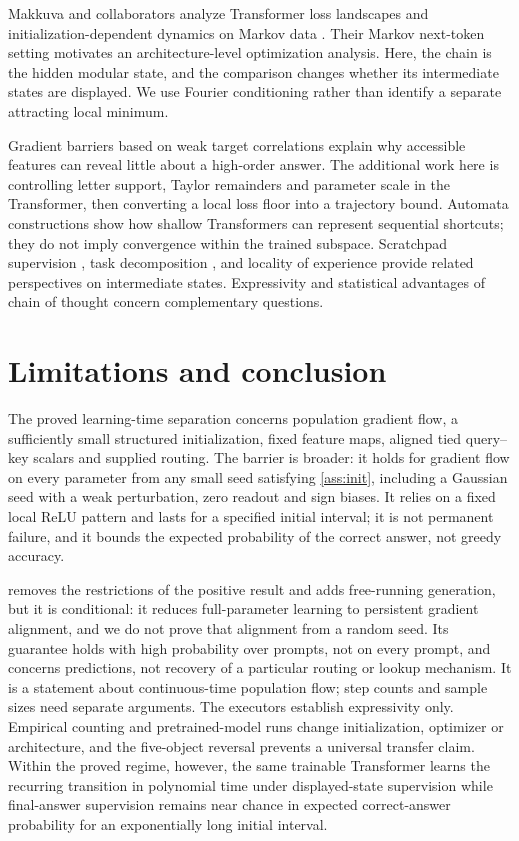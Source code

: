 Makkuva and collaborators analyze Transformer loss landscapes and initialization-dependent dynamics on Markov data \citep{makkuva2025attention,makkuva2024local}. Their Markov next-token setting motivates an architecture-level optimization analysis. Here, the chain is the hidden modular state, and the comparison changes whether its intermediate states are displayed. We use Fourier conditioning rather than identify a separate attracting local minimum.

Gradient barriers based on weak target correlations \citep{shalevshwartz2017failures,abbe2025parities} explain why accessible features can reveal little about a high-order answer. The additional work here is controlling letter support, Taylor remainders and parameter scale in the Transformer, then converting a local loss floor into a trajectory bound. Automata constructions \citep{liu2023automata} show how shallow Transformers can represent sequential shortcuts; they do not imply convergence within the trained subspace. Scratchpad supervision \citep{nye2021scratchpads}, task decomposition \citep{wies2023subtask}, and locality of experience \citep{prystawski2023think} provide related perspectives on intermediate states. Expressivity and statistical advantages of chain of thought \citep{merrill2024expressive,wen2024sparse} concern complementary questions.


\section{Limitations and conclusion}\label{sec:conclusion}
The proved learning-time separation concerns population gradient flow, a sufficiently small structured initialization, fixed feature maps, aligned tied query--key scalars and supplied routing. The barrier is broader: it holds for gradient flow on every parameter from any small seed satisfying \cref{ass:init}, including a Gaussian seed with a weak perturbation, zero readout and sign biases. It relies on a fixed local ReLU pattern and lasts for a specified initial interval; it is not permanent failure, and it bounds the expected probability of the correct answer, not greedy accuracy.

 removes the restrictions of the positive result and adds free-running generation, but it is conditional: it reduces full-parameter learning to persistent gradient alignment, and we do not prove that alignment from a random seed. Its guarantee holds with high probability over prompts, not on every prompt, and concerns predictions, not recovery of a particular routing or lookup mechanism. It is a statement about continuous-time population flow; step counts and sample sizes need separate arguments. The executors establish expressivity only. Empirical counting and pretrained-model runs change initialization, optimizer or architecture, and the five-object reversal prevents a universal transfer claim. Within the proved regime, however, the same trainable Transformer learns the recurring transition in polynomial time under displayed-state supervision while final-answer supervision remains near chance in expected correct-answer probability for an exponentially long initial interval.
